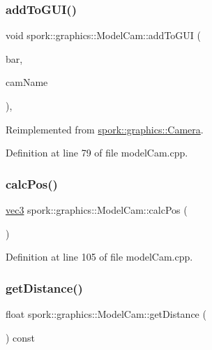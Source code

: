 \subsubsection{\texorpdfstring{add\+To\+G\+U\+I()}{addToGUI()}}
{\footnotesize\ttfamily void spork\+::graphics\+::\+Model\+Cam\+::add\+To\+G\+UI (\begin{DoxyParamCaption}\item[{Tw\+Bar $\ast$}]{bar,  }\item[{const char $\ast$}]{cam\+Name }\end{DoxyParamCaption})\hspace{0.3cm}{\ttfamily [override]}, {\ttfamily [virtual]}}



Reimplemented from \hyperlink{classspork_1_1graphics_1_1_camera_a5ec54ffdedf82db7e3790566bd1e3522}{spork\+::graphics\+::\+Camera}.



Definition at line 79 of file model\+Cam.\+cpp.

\mbox{\label{classspork_1_1graphics_1_1_model_cam_a75760cf6f052df0409086db00d710dc7}} 
\subsubsection{\texorpdfstring{calc\+Pos()}{calcPos()}}
{\footnotesize\ttfamily \hyperlink{structspork_1_1maths_1_1vec3}{vec3} spork\+::graphics\+::\+Model\+Cam\+::calc\+Pos (\begin{DoxyParamCaption}{ }\end{DoxyParamCaption})}



Definition at line 105 of file model\+Cam.\+cpp.

\mbox{\label{classspork_1_1graphics_1_1_model_cam_aea5b9f2322a418e278ba0f730793eb6f}} 
\subsubsection{\texorpdfstring{get\+Distance()}{getDistance()}}
{\footnotesize\ttfamily float spork\+::graphics\+::\+Model\+Cam\+::get\+Distance (\begin{DoxyParamCaption}{ }\end{DoxyParamCaption}) const\hspace{0.3cm}{\ttfamily [inline]}}



